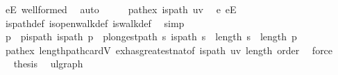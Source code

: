 \begin{isabellebody}
\ {\isacartoucheopen}e{\isasymin}E{\isacartoucheclose}\ wellformed\ \isamarkupfalse%
\ auto\isanewline
\ \ \isamarkupfalse%
\ \isamarkupfalse%
\ path{\isacharunderscore}{\kern0pt}ex{\isacharcolon}{\kern0pt}\ {\isachardoublequoteopen}is{\isacharunderscore}{\kern0pt}path\ {\isacharbrackleft}{\kern0pt}u{\isacharcomma}{\kern0pt}v{\isacharbrackright}{\kern0pt}{\isachardoublequoteclose}\ \isamarkupfalse%
\ e\ {\isacartoucheopen}e{\isasymin}E{\isacartoucheclose}\ \isamarkupfalse%
\ is{\isacharunderscore}{\kern0pt}path{\isacharunderscore}{\kern0pt}def\ is{\isacharunderscore}{\kern0pt}open{\isacharunderscore}{\kern0pt}walk{\isacharunderscore}{\kern0pt}def\ is{\isacharunderscore}{\kern0pt}walk{\isacharunderscore}{\kern0pt}def\ \isamarkupfalse%
\ simp\isanewline
\ \ \isamarkupfalse%
\ p\ \ p{\isacharunderscore}{\kern0pt}is{\isacharunderscore}{\kern0pt}path{\isacharcolon}{\kern0pt}\ {\isachardoublequoteopen}is{\isacharunderscore}{\kern0pt}path\ p{\isachardoublequoteclose}\ \ p{\isacharunderscore}{\kern0pt}longest{\isacharunderscore}{\kern0pt}path{\isacharcolon}{\kern0pt}\ {\isachardoublequoteopen}{\isasymforall}s{\isachardot}{\kern0pt}\ is{\isacharunderscore}{\kern0pt}path\ s\ {\isasymlongrightarrow}\ length\ s\ {\isasymle}\ length\ p{\isachardoublequoteclose}\isanewline
\ \ \ \ \isamarkupfalse%
\ path{\isacharunderscore}{\kern0pt}ex\ length{\isacharunderscore}{\kern0pt}path{\isacharunderscore}{\kern0pt}card{\isacharunderscore}{\kern0pt}V\ ex{\isacharunderscore}{\kern0pt}has{\isacharunderscore}{\kern0pt}greatest{\isacharunderscore}{\kern0pt}nat{\isacharbrackleft}{\kern0pt}of\ is{\isacharunderscore}{\kern0pt}path\ {\isachardoublequoteopen}{\isacharbrackleft}{\kern0pt}u{\isacharcomma}{\kern0pt}v{\isacharbrackright}{\kern0pt}{\isachardoublequoteclose}\ length\ order{\isacharbrackright}{\kern0pt}\ \isamarkupfalse%
\ force\isanewline
\ \ \isamarkupfalse%
\ \isamarkupfalse%
\ {\isacharquery}{\kern0pt}thesis\ \isacommand{{\isachardot}{\kern0pt}{\isachardot}{\kern0pt}}\isamarkupfalse%
\isanewline
{}\isamarkupfalse%
%
\endisatagproof
{\isafoldproof}%
%
\isadelimproof
%
\endisadelimproof
%
\isadelimdocument
%
\endisadelimdocument
%
\isatagdocument
%
\isamarkuptrue%
%
\endisatagdocument
{\isafolddocument}%
%
\isadelimdocument
%
\endisadelimdocument
{}\isamarkupfalse%
\ ulgraph\isanewline
{}\isanewline

\end{isabellebody}
